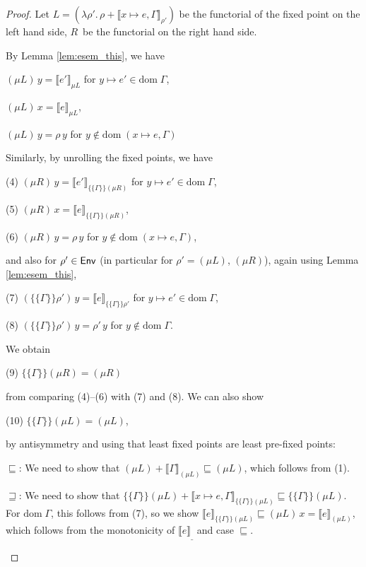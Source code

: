 \documentclass{jfp1}
\theoremstyle{nonumberbreak}
\newtheorem{proof}{Proof}
\newcommand{\sEnv}   {\text{\textsf{Env}}}
\newcommand{\dom}[1]{\text{dom}\;#1}
\newcommand{\dsem}[2]{\llbracket #1 \rrbracket_{#2}}
\newcommand{\esem}[1]{\{\!\!\!\{#1\}\!\!\!\}}
\newcommand{\upd}[1]{\mathop{++_{#1}}}
\begin{document}
\begin{proof}
\newcommand{\domxG}{\dom{(x\mapsto e,\Gamma)}}
Let $L = (\lambda \rho'.\, \rho \upd{\domxG} \dsem{x\mapsto e, \Gamma}{\rho'})$ be the functorial of the fixed point on the left hand side, $R$~be the functorial on the right hand side.

By Lemma \ref{lem:esem_this}, we have
\begin{compactenum}[(1)]
\item $(\mu L)\, y = \dsem{e'}{\mu L}$ for $y\mapsto e'\in\dom\Gamma$,
\item $(\mu L)\, x = \dsem{e}{\mu L}$,
\item $(\mu L)\, y = \rho\, y$ for $y \notin \domxG$
\end{compactenum}
Similarly, by unrolling the fixed points, we have
\begin{compactenum}[(1)]
\item[(4)] $(\mu R)\, y = \dsem{e'}{\esem{\Gamma}{(\mu R)}}$ for $y \mapsto e'\in\dom\Gamma$,
\item[(5)] $(\mu R)\, x = \dsem{e}{\esem{\Gamma}{(\mu R)}}$,
\item[(6)] $(\mu R)\, y = \rho\, y$ for $y \notin \domxG$,
\end{compactenum}
and also for $\rho' \in \sEnv$ (in particular for $\rho' = (\mu L)$, $(\mu R)$), again using Lemma \ref{lem:esem_this},
\begin{compactenum}[(1)]
\item[(7)] $(\esem{\Gamma}{\rho'})\,y = \dsem{e}{\esem{\Gamma}{\rho'}}$ for $y \mapsto e' \in \dom\Gamma$,
\item[(8)] $(\esem{\Gamma}{\rho'})\,y = \rho'\, y$ for $y \notin \dom\Gamma$.
\end{compactenum}

\medskip
We obtain
\begin{compactenum}[(1)]
\item[(9)] $\esem{\Gamma}{(\mu R)} = (\mu R)$
\end{compactenum}
from comparing (4)--(6) with (7) and (8). We can also show
\begin{compactenum}[(1)]
\item[(10)] $\esem{\Gamma}{(\mu L)} = (\mu L)$,
\end{compactenum}
by antisymmetry and using that least fixed points are least pre-fixed points:
\begin{compactitem}[$\sqsubseteq$:]
\item[$\sqsubseteq$:] We need to show that $(\mu L) \upd{\dom\Gamma} \dsem{\Gamma}{(\mu L)} \sqsubseteq (\mu L)$, which follows from (1). 
\item[$\sqsupseteq$:] We need to show that $\esem{\Gamma}{(\mu L)} \upd{\domxG} \dsem{x\mapsto e, \Gamma}{\esem{\Gamma}{(\mu L)}} \sqsubseteq \esem{\Gamma}{(\mu L)}$. For $\dom\Gamma$, this follows from (7), so we show $\dsem{e}{\esem{\Gamma}{(\mu L)}} \sqsubseteq (\mu L)\, x = \dsem{e}{(\mu L)}$, which follows from the monotonicity of $\dsem{e}{\_}$ and case $\sqsubseteq$.
\end{compactitem}


\end{proof}
\end{document}
